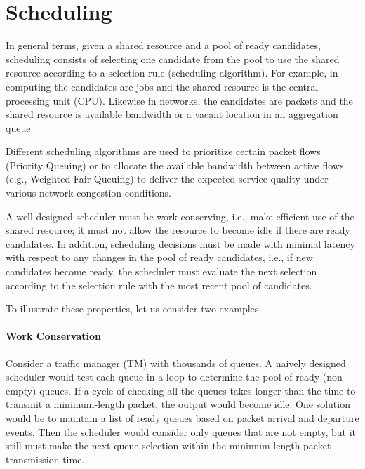 \section{Scheduling}

In general terms, given a shared resource and a pool of ready candidates, scheduling consists of selecting one candidate from the pool to use the shared resource according to a selection rule (scheduling algorithm).  For example, in computing the candidates are jobs and the shared resource is the central processing unit (CPU).  Likewise in networks, the candidates are packets and the shared resource is available bandwidth or a vacant location in an aggregation queue.

Different scheduling algorithms are used to prioritize certain packet flows (Priority Queuing) or to allocate the available bandwidth between active flows (e.g., Weighted Fair Queuing) to deliver the expected service quality under various network congestion conditions.

A well designed scheduler must be work-conserving, i.e., make efficient use of the shared resource; it must not allow the resource to become idle if there are ready candidates.  In addition, scheduling decisions must be made with minimal latency with respect to any changes in the pool of ready candidates, i.e., if new candidates become ready, the scheduler must evaluate the next selection according to the selection rule with the most recent pool of candidates.

To illustrate these properties, let us consider two examples.
\paragraph{Work Conservation}
Consider a traffic manager (TM) with thousands of queues. A naively designed scheduler would test each queue in a loop to determine the pool of ready (non-empty) queues.  If a cycle of checking all the queues takes longer than the time to transmit a minimum-length packet, the output would become idle.  One solution would be to maintain a list of ready queues based on packet arrival and departure events.  Then the scheduler would consider only queues that are not empty, but it still must make the next queue selection within the minimum-length packet transmission time.
